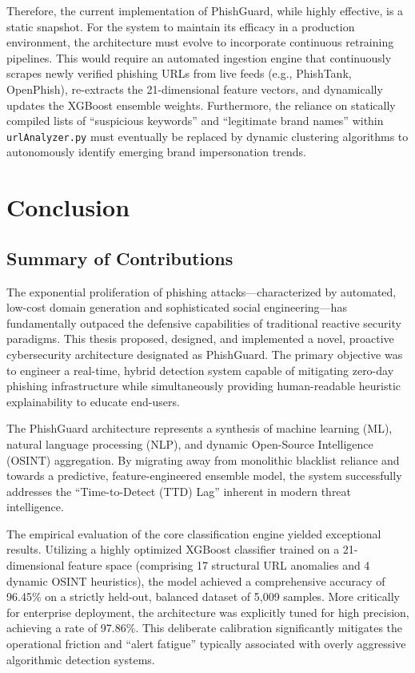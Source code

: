 Therefore, the current implementation of PhishGuard, while highly
effective, is a static snapshot. For the system to maintain its efficacy
in a production environment, the architecture must evolve to incorporate
continuous retraining pipelines. This would require an automated
ingestion engine that continuously scrapes newly verified phishing URLs
from live feeds (e.g., PhishTank, OpenPhish), re-extracts the
21-dimensional feature vectors, and dynamically updates the XGBoost
ensemble weights. Furthermore, the reliance on statically compiled lists
of ``suspicious keywords'' and ``legitimate brand names'' within
\texttt{urlAnalyzer.py} must eventually be replaced by dynamic
clustering algorithms to autonomously identify emerging brand
impersonation trends. 

\section{Conclusion}

\subsection{Summary of Contributions}\label{summary-of-contributions}

The exponential proliferation of phishing attacks---characterized by
automated, low-cost domain generation and sophisticated social
engineering---has fundamentally outpaced the defensive capabilities of
traditional reactive security paradigms. This thesis proposed, designed,
and implemented a novel, proactive cybersecurity architecture designated
as PhishGuard. The primary objective was to engineer a real-time, hybrid
detection system capable of mitigating zero-day phishing infrastructure
while simultaneously providing human-readable heuristic explainability
to educate end-users.

The PhishGuard architecture represents a synthesis of machine learning
(ML), natural language processing (NLP), and dynamic Open-Source
Intelligence (OSINT) aggregation. By migrating away from monolithic
blacklist reliance and towards a predictive, feature-engineered ensemble
model, the system successfully addresses the ``Time-to-Detect (TTD)
Lag'' inherent in modern threat intelligence.

The empirical evaluation of the core classification engine yielded
exceptional results. Utilizing a highly optimized XGBoost classifier
trained on a 21-dimensional feature space (comprising 17 structural URL
anomalies and 4 dynamic OSINT heuristics), the model achieved a
comprehensive accuracy of 96.45\% on a strictly held-out, balanced
dataset of 5,009 samples. More critically for enterprise deployment, the
architecture was explicitly tuned for high precision, achieving a rate
of 97.86\%. This deliberate calibration significantly mitigates the
operational friction and ``alert fatigue'' typically associated with
overly aggressive algorithmic detection systems.

